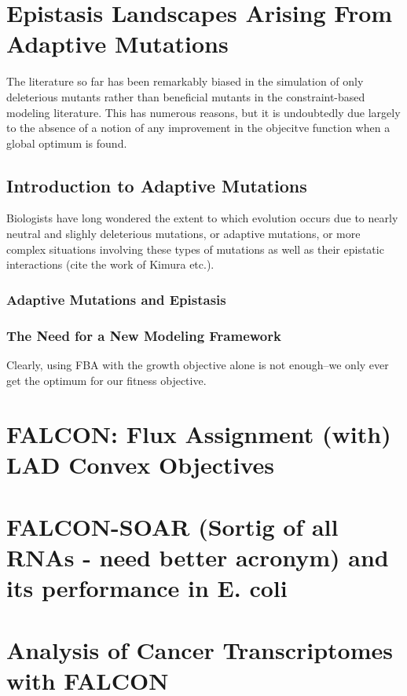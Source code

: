 \documentclass[phd,tocprelim,draft]{cornell}
\newcommand*{\commonDir}{../common/}   %
\begin{document}
\chapter{Epistasis Landscapes Arising From Adaptive Mutations}
The literature so far has been remarkably biased in the simulation of only
deleterious mutants rather than beneficial mutants in the constraint-based modeling
literature. This has numerous reasons, but it is undoubtedly due largely to 
the absence of a notion of any improvement in the objecitve function when a global optimum
is found. 

\section{Introduction to Adaptive Mutations}
Biologists have long wondered the extent to which evolution occurs due to nearly neutral 
and slighly deleterious mutations, or adaptive mutations, or more complex situations involving
these types of mutations as well as their epistatic interactions (cite the work of Kimura etc.).
 
\subsection{Adaptive Mutations and Epistasis}

\subsection{The Need for a New Modeling Framework}
Clearly, using FBA with the growth objective alone is not enough--we only ever get the 
optimum for our fitness objective.

\chapter{FALCON: Flux Assignment (with) LAD Convex Objectives}

\falconAbstractMotivation \falconAbstractResults


\chapter{FALCON-SOAR (Sortig of all RNAs - need better acronym) and its performance in E. coli} 


\chapter{Analysis of Cancer Transcriptomes with FALCON}
\end{document}
